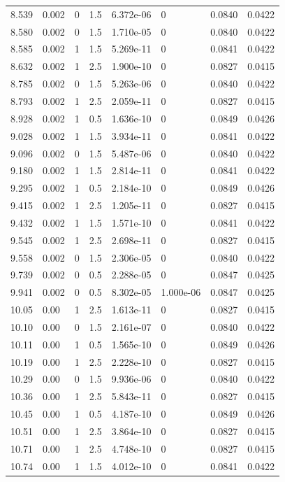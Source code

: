 \documentclass[preview]{standalone}
\begin{document}
{{{\begin{tabular}{L{1.2cm}C{1.2cm} C{0.3cm}C{0.5cm} C{1.4cm}C{1.4cm} C{1.4cm}C{1.4cm}}
  8.539  &  0.002  & 0     & 1.5 &  6.372e-06  & 0  & 0.0840 &  0.0422   \\ 
  8.580  &  0.002  & 0     & 1.5 &  1.710e-05  & 0  & 0.0840 &  0.0422   \\ 
  8.585  &  0.002  & 1     & 1.5 &  5.269e-11  & 0  & 0.0841 &  0.0422   \\ 
  8.632  &  0.002  & 1     & 2.5 &  1.900e-10  & 0  & 0.0827 &  0.0415   \\ 
  8.785  &  0.002  & 0     & 1.5 &  5.263e-06  & 0  & 0.0840 &  0.0422   \\ 
  8.793  &  0.002  & 1     & 2.5 &  2.059e-11  & 0  & 0.0827 &  0.0415   \\ 
  8.928  &  0.002  & 1     & 0.5 &  1.636e-10  & 0  & 0.0849 &  0.0426   \\ 
  9.028  &  0.002  & 1     & 1.5 &  3.934e-11  & 0  & 0.0841 &  0.0422   \\ 
  9.096  &  0.002  & 0     & 1.5 &  5.487e-06  & 0  & 0.0840 &  0.0422   \\ 
  9.180  &  0.002  & 1     & 1.5 &  2.814e-11  & 0  & 0.0841 &  0.0422   \\ 
  9.295  &  0.002  & 1     & 0.5 &  2.184e-10  & 0  & 0.0849 &  0.0426   \\ 
  9.415  &  0.002  & 1     & 2.5 &  1.205e-11  & 0  & 0.0827 &  0.0415   \\ 
  9.432  &  0.002  & 1     & 1.5 &  1.571e-10  & 0  & 0.0841 &  0.0422   \\ 
  9.545  &  0.002  & 1     & 2.5 &  2.698e-11  & 0  & 0.0827 &  0.0415   \\ 
  9.558  &  0.002  & 0     & 1.5 &  2.306e-05  & 0  & 0.0840 &  0.0422   \\ 
  9.739  &  0.002  & 0     & 0.5 &  2.288e-05  & 0  & 0.0847 &  0.0425   \\ 
  9.941  &  0.002  & 0     & 0.5 &  8.302e-05  & 1.000e-06  & 0.0847 &  0.0425   \\ 
  10.05  &  0.00  & 1     & 2.5 &  1.613e-11  & 0  & 0.0827 &  0.0415   \\ 
  10.10  &  0.00  & 0     & 1.5 &  2.161e-07  & 0  & 0.0840 &  0.0422   \\ 
  10.11  &  0.00  & 1     & 0.5 &  1.565e-10  & 0  & 0.0849 &  0.0426   \\ 
  10.19  &  0.00  & 1     & 2.5 &  2.228e-10  & 0  & 0.0827 &  0.0415   \\ 
  10.29  &  0.00  & 0     & 1.5 &  9.936e-06  & 0  & 0.0840 &  0.0422   \\ 
  10.36  &  0.00  & 1     & 2.5 &  5.843e-11  & 0  & 0.0827 &  0.0415   \\ 
  10.45  &  0.00  & 1     & 0.5 &  4.187e-10  & 0  & 0.0849 &  0.0426   \\ 
  10.51  &  0.00  & 1     & 2.5 &  3.864e-10  & 0  & 0.0827 &  0.0415   \\ 
  10.71  &  0.00  & 1     & 2.5 &  4.748e-10  & 0  & 0.0827 &  0.0415   \\ 
  10.74  &  0.00  & 1     & 1.5 &  4.012e-10  & 0  & 0.0841 &  0.0422   \\ 
\hline 
\end{tabular} 

}}}
\end{document}
